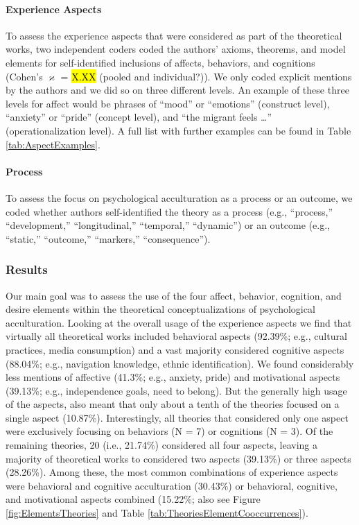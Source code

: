 \paragraph{Experience Aspects}

To assess the experience aspects that were considered as part of the
theoretical works, two independent coders coded the authors' axioms,
theorems, and model elements for self-identified inclusions of affects,
behaviors, and cognitions (Cohen's \(\varkappa\) = \hl{X.XX} (pooled and
individual?)). We only coded explicit mentions by the authors and we did
so on three different levels. An example of these three levels for
affect would be phrases of ``mood'' or ``emotions'' (construct level),
``anxiety'' or ``pride'' (concept level), and ``the migrant feels
\ldots{}'' (operationalization level). A full list with further examples
can be found in Table \ref{tab:AspectExamples}.

\paragraph{Process}

To assess the focus on psychological acculturation as a process or an
outcome, we coded whether authors self-identified the theory as a
process (e.g., ``process,'' ``development,'' ``longitudinal,''
``temporal,'' ``dynamic'') or an outcome (e.g., ``static,'' ``outcome,''
``markers,'' ``consequence'').

\subsubsection{Results}

Our main goal was to assess the use of the four affect, behavior,
cognition, and desire elements within the theoretical conceptualizations
of psychological acculturation. Looking at the overall usage of the
experience aspects we find that virtually all theoretical works included
behavioral aspects (92.39\%; e.g., cultural practices, media
consumption) and a vast majority considered cognitive aspects (88.04\%;
e.g., navigation knowledge, ethnic identification). We found
considerably less mentions of affective (41.3\%; e.g., anxiety, pride)
and motivational aspects (39.13\%; e.g., independence goals, need to
belong). But the generally high usage of the aspects, also meant that
only about a tenth of the theories focused on a single aspect (10.87\%).
Interestingly, all theories that considered only one aspect were
exclusively focusing on behaviors (N = 7) or cognitions (N = 3). Of the
remaining theories, 20 (i.e., 21.74\%) considered all four aspects,
leaving a majority of theoretical works to considered two aspects
(39.13\%) or three aspects (28.26\%). Among these, the most common
combinations of experience aspects were behavioral and cognitive
acculturation (30.43\%) or behavioral, cognitive, and motivational
aspects combined (15.22\%; also see Figure \ref{fig:ElementsTheories}
and Table \ref{tab:TheoriesElementCooccurrences}).

